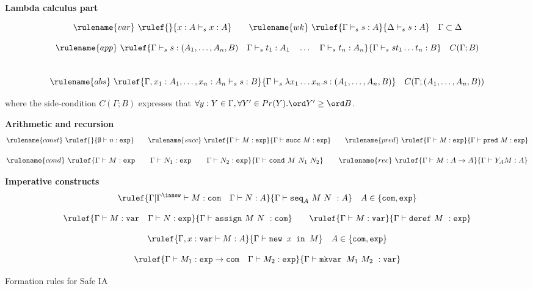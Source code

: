 \begin{table}
 {\bf Lambda calculus part}

$$ \rulename{var} \ \rulef{}{x : A  \vdash_s x : A}
\qquad \rulename{wk} \ \rulef{\Gamma \vdash_s s :
A}{\Delta \vdash_s s : A} \quad \Gamma \subset
\Delta
$$

{
$$ \rulename{app} \ \rulef{\Gamma  \vdash_s s : (A_1,\ldots,A_n,B) \quad
\Gamma  \vdash_s t_1 : A_1 \quad \ldots \quad \Gamma  \vdash_s t_n : A_n
} {\Gamma  \vdash_s s t_1 \ldots t_n : B} \quad C(\Gamma ; B)$$ \\
$$ \rulename{abs} \ \rulef{\Gamma, x_1 : A_1, \ldots, x_n : A_n
  \vdash_s s : B} {\Gamma \vdash_s \lambda x_1 \ldots x_n . s :
  (A_1, \ldots ,A_n,B)} \quad C(\Gamma ; (A_1, \ldots ,A_n,B) )$$
}

where the side-condition $C(\Gamma ; B)$ expresses that $\forall y:Y
\in \Gamma, \forall Y' \in Pr(Y) . \ord Y' \geq \ord B$.


{\bf Arithmetic and recursion}
$$ \rulename{const} \ \rulef{}{\emptyset  \vdash n :\texttt{exp}}
\qquad \rulename{succ} \ \rulef{\Gamma \vdash M:\texttt{exp} }{\Gamma \vdash \texttt{succ}\ M:\texttt{exp}}
\qquad \rulename{pred} \ \rulef{\Gamma \vdash M:\texttt{exp} }{\Gamma \vdash \texttt{pred}\ M:\texttt{exp}}$$

$$
\rulename{cond} \ \rulef{\Gamma\vdash M : \texttt{exp} \qquad \Gamma\vdash N_1 : \texttt{exp} \qquad \Gamma\vdash N_2 : \texttt{exp} }{\Gamma \vdash \texttt{cond}\ M\ N_1\ N_2}
\qquad  \rulename{rec} \ \rulef{\Gamma \vdash M : A\rightarrow A }{ \Gamma \vdash Y_A M : A}$$

{\bf Imperative constructs}
$$ \rulef{\Gamma| \Gamma^{\ianew} \vdash M : \texttt{com} \quad \Gamma \vdash N :A}
    {\Gamma \vdash \texttt{seq}_A \ M\ N\ : A} \quad A \in \{ \texttt{com}, \texttt{exp}\}$$

$$ \rulef{\Gamma \vdash M : \texttt{var} \quad \Gamma \vdash N : \texttt{exp}}
    {\Gamma \vdash \texttt{assign}\ M\ N\ : \texttt{com}}
\qquad
 \rulef{\Gamma \vdash M : \texttt{var}}
    {\Gamma \vdash \texttt{deref}\ M\ : \texttt{exp}}$$

$$ \rulef{\Gamma , x : \texttt{var} \vdash M : A}
    {\Gamma  \vdash \texttt{new } x \texttt{ in } M} \quad A \in \{ \texttt{com}, \texttt{exp}\}$$

$$ \rulef{\Gamma \vdash M_1 : \texttt{exp} \rightarrow \texttt{com} \quad \Gamma \vdash M_2 : \texttt{exp}}
    {\Gamma \vdash \texttt{mkvar } M_1\ M_2\ : \texttt{var}}$$
\caption{Formation rules for Safe IA} \label{tab:safeia_formrules}
\end{table}


